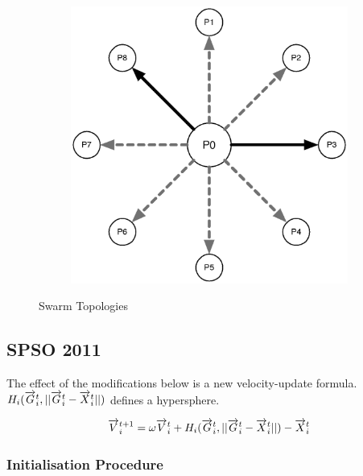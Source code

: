 \documentclass{csfourzero}
\newcommand{\rarrow}[1]{\overrightarrow{#1\vphantom{b}}}
\begin{document}
\begin{figure}
\begin{subfigure}[b]{0.3\textwidth}
    \label{fig:ring_topology}
  \end{subfigure}
  ~
  \begin{subfigure}[b]{0.3\textwidth}
    \includegraphics[width=\textwidth]{star_topology.eps}
    \label{fig:adaptive_random_topology}
  \end{subfigure}
  \caption{Swarm Topologies}
  \label{fig:swarm_topology}
\end{figure}

\subsection{SPSO 2011}

The effect of the modifications below is a new velocity-update formula.
$H_i(\rarrow{G}_i^t,||\rarrow{G}_i^t - \rarrow{X}_i^t||)$ defines a
hypersphere.

\begin{equation}
  \rarrow{V}_i^{t+1} = \omega \rarrow{V}_i^t + H_i(\rarrow{G}_i^t,||\rarrow{G}_i^t - \rarrow{X}_i^t||) - \rarrow{X}_i^t
\end{equation}

\subsubsection{Initialisation Procedure}
\end{document}
